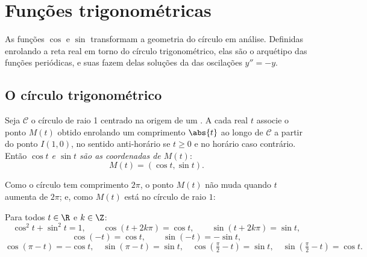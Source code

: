 \chapter{Funções trigonométricas}\label{ch:g12:trigo}

As funções $\cos$ e $\sin$ transformam a geometria do círculo em análise.
Definidas enrolando a reta real em torno do círculo trigonométrico, elas
são o arquétipo das funções periódicas, e suas  fazem delas
soluções da  das oscilações $y'' = -y$.

\section{O círculo trigonométrico}

\begin{definition}\label{def:g12:trigo:cossin}
Seja $\mathcal{C}$ o círculo de raio 1 centrado na origem de um  . A cada real $t$ associe o ponto $M(t)$ obtido
enrolando um comprimento $\abs{t}$ ao longo de $\mathcal{C}$ a partir do
ponto $I(1,0)$, no sentido anti-horário se $t \geq 0$ e no horário caso
contrário. Então \emph{$\cos t$ e $\sin t$ são as coordenadas de
$M(t)$}:
\[
M(t) = (\cos t, \sin t).
\]
\end{definition}

\begin{omfigure}
\end{omfigure}

Como o círculo tem comprimento $2\pi$, o ponto $M(t)$ não muda quando $t$
aumenta de $2\pi$; e, como $M(t)$ está no círculo de raio $1$:

\begin{proposition}\label{prop:g12:trigo:identities}
Para todos $t \in \R$ e $k \in \Z$:
\[
\cos^2 t + \sin^2 t = 1, \qquad
\cos(t + 2k\pi) = \cos t, \qquad
\sin(t + 2k\pi) = \sin t,
\]
\[
\cos(-t) = \cos t, \qquad \sin(-t) = -\sin t,
\]
\[
\cos(\pi - t) = -\cos t, \quad \sin(\pi - t) = \sin t, \quad
\cos\left(\tfrac{\pi}{2} - t\right) = \sin t, \quad
\sin\left(\tfrac{\pi}{2} - t\right) = \cos t .
\]
\end{proposition}

